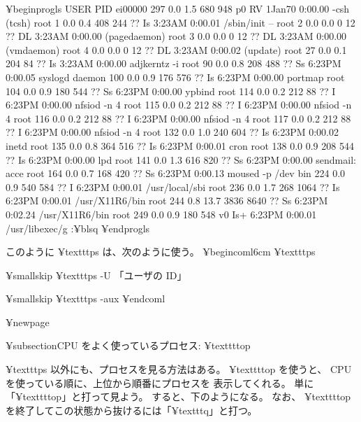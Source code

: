 ¥begin{progls}
USER       PID %
ei00000    297  0.0  1.5   680  948  p0  RV    1Jan70    0:00.00 -csh (tcsh)
root         1  0.0  0.4   408  244  ??  Is    3:23AM    0:00.01 /sbin/init --
root         2  0.0  0.0     0   12  ??  DL    3:23AM    0:00.00  (pagedaemon)
root         3  0.0  0.0     0   12  ??  DL    3:23AM    0:00.00  (vmdaemon)
root         4  0.0  0.0     0   12  ??  DL    3:23AM    0:00.02  (update)
root        27  0.0  0.1   204   84  ??  Is    3:23AM    0:00.00 adjkerntz -i
root        90  0.0  0.8   208  488  ??  Ss    6:23PM    0:00.05 syslogd
daemon     100  0.0  0.9   176  576  ??  Is    6:23PM    0:00.00 portmap
root       104  0.0  0.9   180  544  ??  Ss    6:23PM    0:00.00 ypbind
root       114  0.0  0.2   212   88  ??  I     6:23PM    0:00.00 nfsiod -n 4
root       115  0.0  0.2   212   88  ??  I     6:23PM    0:00.00 nfsiod -n 4
root       116  0.0  0.2   212   88  ??  I     6:23PM    0:00.00 nfsiod -n 4
root       117  0.0  0.2   212   88  ??  I     6:23PM    0:00.00 nfsiod -n 4
root       132  0.0  1.0   240  604  ??  Is    6:23PM    0:00.02 inetd
root       135  0.0  0.8   364  516  ??  Is    6:23PM    0:00.01 cron
root       138  0.0  0.9   208  544  ??  Is    6:23PM    0:00.00 lpd
root       141  0.0  1.3   616  820  ??  Ss    6:23PM    0:00.00 sendmail: acce
root       164  0.0  0.7   168  420  ??  Ss    6:23PM    0:00.13 moused -p /dev
bin        224  0.0  0.9   540  584  ??  I     6:23PM    0:00.01 /usr/local/sbi
root       236  0.0  1.7   268 1064  ??  Is    6:23PM    0:00.01 /usr/X11R6/bin
root       244  0.8 13.7  3836 8640  ??  Ss    6:23PM    0:02.24 /usr/X11R6/bin
root       249  0.0  0.9   180  548  v0  Is+   6:23PM    0:00.01 /usr/libexec/g
:¥blsq
¥end{progls}


このように ¥texttt{ps} は、次のように使う。
¥begin{coml}{6cm}
¥texttt{ps}

¥smallskip
¥texttt{ps -U 「ユーザの ID」}

¥smallskip
¥texttt{ps -aux}
¥end{coml}

¥newpage

¥subsection{CPU をよく使っているプロセス: ¥texttt{top}}

¥texttt{ps} 以外にも、プロセスを見る方法はある。
¥texttt{top} を使うと、 CPU を使っている順に、上位から順番にプロセスを
表示してくれる。
単に「¥texttt{top}」と打って見よう。
すると、下のようになる。
なお、 ¥texttt{top} を終了してこの状態から抜けるには「¥texttt{q}」と打つ。

